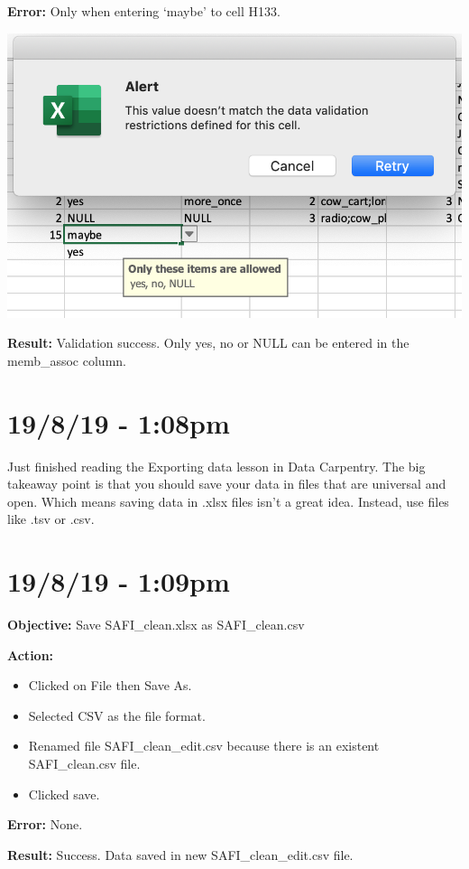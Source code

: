 \documentclass{article}
\begin{document}
\textbf{Error:} Only when entering ‘maybe’ to cell H133.

\includegraphics[width=\textwidth]{figg.png}

\textbf{Result:} Validation success. Only yes, no or NULL can be entered in the memb\_assoc column.

\section*{19/8/19 - 1:08pm}

Just finished reading the Exporting data lesson in Data Carpentry. The big takeaway point is that you should save your data in files that are universal and open. Which means saving data in .xlsx files isn’t a great idea. Instead, use files like .tsv or .csv.

\section*{19/8/19 - 1:09pm}

\textbf{Objective:} Save SAFI\_clean.xlsx as SAFI\_clean.csv

\textbf{Action:}
\begin{itemize}
    \item Clicked on File then Save As.
    \item Selected CSV as the file format.
    \item Renamed file SAFI\_clean\_edit.csv because there is an existent SAFI\_clean.csv file.
    \item Clicked save.
\end{itemize}

\textbf{Error:} None.

\textbf{Result:} Success. Data saved in new SAFI\_clean\_edit.csv file. 
\end{document}
